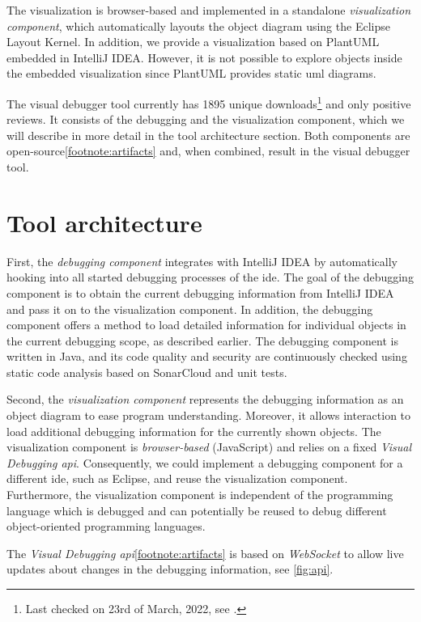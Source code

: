 \documentclass[conference]{IEEEtran}
\newcommand{\intellij}{IntelliJ IDEA}
\begin{document}
The visualization is browser-based and implemented in a standalone \textit{visualization component}, which automatically layouts the object diagram using the Eclipse Layout Kernel.
In addition, we provide a visualization based on PlantUML embedded in \intellij{}.
However, it is not possible to explore objects inside the embedded visualization since PlantUML provides static \gls*{uml} diagrams.

The visual debugger tool currently has 1895 unique downloads\footnote{\label{footnote:pluginStats}Last checked on 23rd of March, 2022, see \cite{VisualDebuggerIntelliJ}.} and only positive reviews.
It consists of the debugging and the visualization component, which we will describe in more detail in the tool architecture section.
Both components are open-source\cref{footnote:artifacts} and, when combined, result in the visual debugger tool.

\section{Tool architecture}  \label{sec:architecture}
First, the \textit{debugging component} integrates with \intellij{} by automatically hooking into all started debugging processes of the \gls*{ide}.
The goal of the debugging component is to obtain the current debugging information from \intellij{} and pass it on to the visualization component.
In addition, the debugging component offers a method to load detailed information for individual objects in the current debugging scope, as described earlier.
The debugging component is written in Java, and its code quality and security are continuously checked using static code analysis based on SonarCloud and unit tests.

Second, the \textit{visualization component} represents the debugging information as an object diagram to ease program understanding.
Moreover, it allows interaction to load additional debugging information for the currently shown objects.
The visualization component is \emph{browser-based} (JavaScript) and relies on a fixed \emph{Visual Debugging \gls*{api}}.
Consequently, we could implement a debugging component for a different \gls*{ide}, such as Eclipse, and reuse the visualization component.
Furthermore, the visualization component is independent of the programming language which is debugged and can potentially be reused to debug different object-oriented programming languages.

The \textit{Visual Debugging \gls*{api}}\cref{footnote:artifacts} is based on \emph{WebSocket} to allow live updates about changes in the debugging information, see \autoref{fig:api}.
\end{document}
